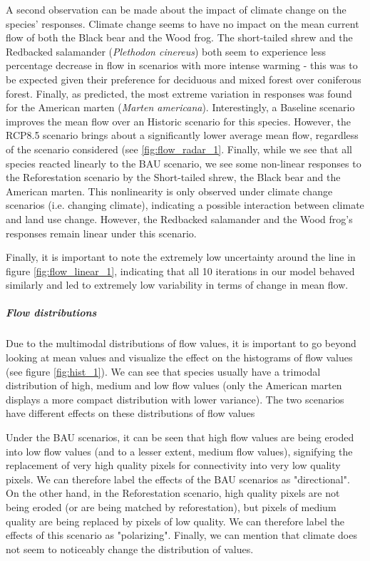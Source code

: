 A second observation can be made about the impact of climate change on the species' responses. Climate change seems to have no impact on the mean current flow of both the Black bear and the Wood frog. The short-tailed shrew and the Redbacked salamander (\textit{Plethodon cinereus}) both seem to experience less percentage decrease in flow in scenarios with more intense warming - this was to be expected given their preference for deciduous and mixed forest over coniferous forest. Finally, as predicted, the most extreme variation in responses was  found for the American marten (\textit{Marten americana}). Interestingly, a Baseline scenario improves the mean flow over an Historic scenario for this species. However, the RCP8.5 scenario brings about a significantly lower average mean flow, regardless of the scenario considered (see \ref{fig:flow_radar_1}.
Finally, while we see that all species reacted linearly to the BAU scenario, we see some non-linear responses to the Reforestation scenario by the Short-tailed shrew, the Black bear and the American marten. This nonlinearity is only observed under climate change scenarios (i.e. changing climate), indicating a possible interaction between climate and land use change. However, the Redbacked salamander and the Wood frog's responses remain linear under this scenario.

Finally, it is important to note the extremely low uncertainty around the line in figure \ref{fig:flow_linear_1}, indicating that all 10 iterations in our model behaved similarly and led to extremely low variability in terms of change in mean flow.

 \vspace{1em}

\subparagraph*{\textit{Flow distributions}} Due to the multimodal distributions of flow values, it is important to go beyond looking at mean values and visualize the effect on the histograms of flow values (see figure \ref{fig:hist_1}). We can see that species usually have a trimodal distribution of high, medium and low flow values (only the American marten displays a more compact distribution with lower variance). The two scenarios have different effects on these distributions of flow values

Under the BAU scenarios, it can be seen that high flow values are being eroded into low flow values (and to a lesser extent, medium flow values), signifying the replacement of very high quality pixels for connectivity into very low quality pixels. We can therefore label the effects of the BAU scenarios as "directional". On the other hand, in the Reforestation scenario, high quality pixels are not being eroded (or are being matched by reforestation), but pixels of medium quality are being replaced by pixels of low quality. We can therefore label the effects of this scenario as "polarizing". Finally, we can mention that climate does not seem to noticeably change the distribution of values.\\

